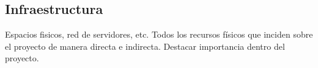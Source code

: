 \subsection{Infraestructura}
Espacios fisicos, red de servidores, etc. Todos los recursos físicos que inciden sobre el proyecto de manera directa e indirecta. Destacar importancia dentro del proyecto.
